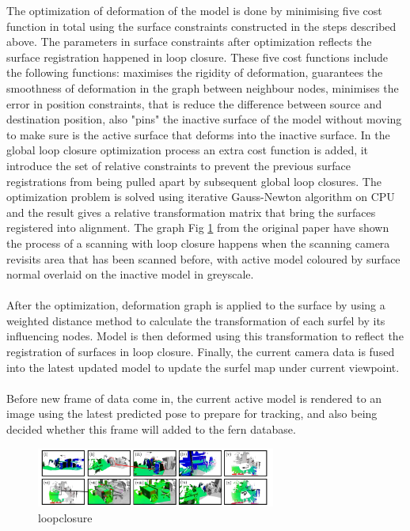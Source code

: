 \documentclass[12pt,twoside]{article}
\begin{document}
The optimization of deformation of the model is done by minimising five cost function in total using the surface constraints constructed in the steps described above. The parameters in surface constraints after optimization reflects the surface registration happened in loop closure. These five cost functions include the following functions: maximises the rigidity of deformation, guarantees the smoothness of deformation in the graph between neighbour nodes, minimises the error in position constraints, that is reduce the difference between source and destination position, also "pins" the inactive surface of the model without moving to make sure is the active surface that deforms into the inactive surface. In the global loop closure optimization process an extra cost function is added, it introduce the set of relative constraints to prevent the previous surface registrations from being pulled apart by subsequent global loop closures. The optimization problem is  solved using iterative Gauss-Newton algorithm on CPU and the result gives a relative transformation matrix that bring the surfaces registered into alignment. The graph Fig \ref{fig:loopclosure} from the original paper have shown the process of a scanning with loop closure happens when the scanning camera revisits area that has been scanned before, with active model coloured by surface normal overlaid on the inactive model in greyscale.\\
\\
After the optimization, deformation graph is applied to the surface by using a weighted distance method to calculate the transformation of each surfel by its influencing nodes. Model is then deformed using this transformation to reflect the registration of surfaces in loop closure. Finally, the current camera data is fused into the latest updated model to update the surfel map under current viewpoint.\\
\\
Before new frame of data come in, the current active model is rendered to an image using the latest predicted pose to prepare for tracking, and also being decided whether this frame will added to the fern database.\\
\begin{figure}[h]
    \centering
    \includegraphics[width=0.7\textwidth]{figures/loopclosure}
    \caption{loopclosure}
    \label{fig:loopclosure}
\end{figure}
\end{document}
